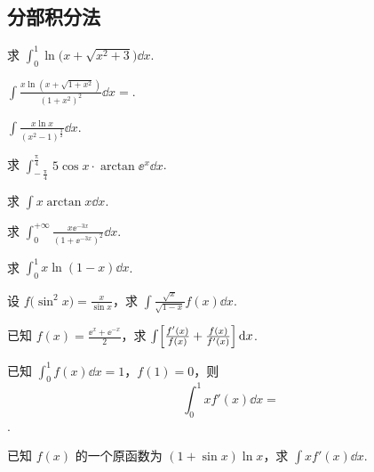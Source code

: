 \subsection{分部积分法}

	\begin{ti}
		求 $\int_{0}^{1} \ln \bigl( x + \sqrt{x^{2} + 3} \bigr) \dd{x}$.
	\end{ti}

	\begin{ti}
		$\int \frac{x \ln ( x + \sqrt{1 + x^{2}} )}{\left( 1 + x^{2} \right)^{2}} \dd{x} = $\htwo.
	\end{ti}

	\begin{ti}
		$\int \frac{x \ln x}{\left( x^{2} - 1 \right)^{\frac{3}{2}}} \dd{x}$.
	\end{ti}

	\begin{ti}
		求 $\int_{-\frac{\uppi}{4}}^{\frac{\uppi}{4}} 5 \cos x \cdot \arctan \ee^{x} \dd{x}$.
	\end{ti}

	\begin{ti}
		求 $\int x \arctan x \dd{x}$.
	\end{ti}

	\begin{ti}
		求 $\int_{0}^{+\infty} \frac{x \ee^{-3x}}{\left( 1 + \ee^{-3x} \right)^{2}} \dd{x}$.
	\end{ti}

	\begin{ti}
		求 $\int_{0}^{1} x \ln (1 - x) \dd{x}$.
	\end{ti}

	\begin{ti}
		设 $f\bigl( \sin^{2}x \bigr) = \frac{x}{\sin x}$，求 $\int \frac{\sqrt{x}}{\sqrt{1 - x}} f(x) \dd{x}$.
	\end{ti}

	\begin{ti}
		已知 $f(x) = \frac{\ee^{x} + \ee^{-x}}{2}$，求 $\int \Bigl[ \frac{f'(x)}{f(x)} + \frac{f(x)}{f'(x)} \Bigr] \dd{x}$.
	\end{ti}

	\begin{ti}
		已知 $\int_{0}^{1} f(x) \dd{x} = 1$，$f(1) = 0$，则 \[\int_{0}^{1} x f'(x) \dd{x} = \]
		\htwo.
	\end{ti}

	\begin{ti}
		已知 $f(x)$ 的一个原函数为 $(1 + \sin x) \ln x$，求 $\int x f'(x) \dd{x}$.
	\end{ti}

